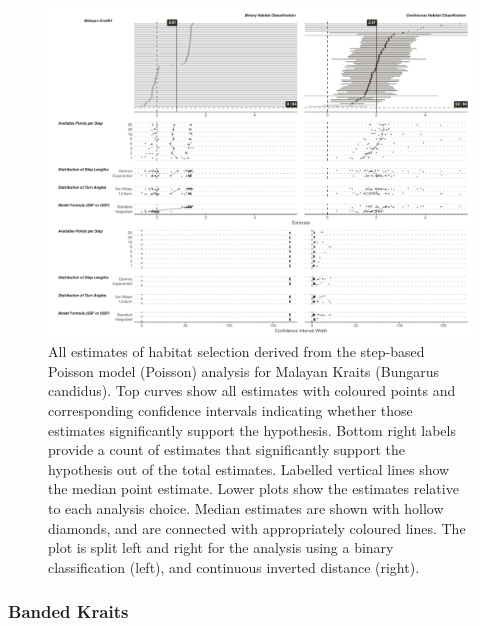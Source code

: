 \documentclass[10pt,a4paper]{article}
\begin{document}
\begin{figure}
\includegraphics[width=1\linewidth]{../../figures/specCurve_Malayan Krait_pois} \caption{All estimates of habitat selection derived from the step-based Poisson model (Poisson) analysis for Malayan Kraits (Bungarus candidus). Top curves show all estimates with coloured points and corresponding confidence intervals indicating whether those estimates significantly support the hypothesis. Bottom right labels provide a count of estimates that significantly support the hypothesis out of the total estimates. Labelled vertical lines show the median point estimate. Lower plots show the estimates relative to each analysis choice. Median estimates are shown with hollow diamonds, and are connected with appropriately coloured lines. The plot is split left and right for the analysis using a binary classification (left), and continuous inverted distance (right).}\label{fig:specCurvePoisBUCA}
\end{figure}

\subsubsection{Banded Kraits}\label{banded-kraits}
\end{document}
